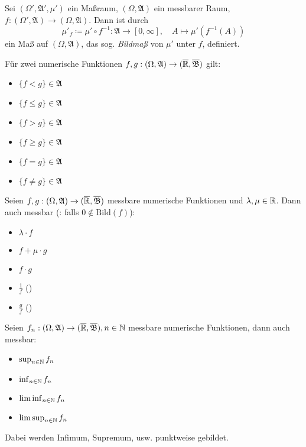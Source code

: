 \documentclass{cheat-sheet}
\newcommand{\Alg}{\mathfrak{A}} %
\newcommand{\ER}{\overline\R} %
\newcommand{\Bor}{\mathfrak{B}} %
\begin{document}
\begin{defn}
  Sei $(\Omega', \Alg', \mu')$ ein Maßraum, $(\Omega, \Alg)$ ein messbarer Raum, $f : (\Omega', \Alg) \to (\Omega, \Alg)$. Dann ist durch
  \[ \mu'_f \coloneqq \mu' \circ f^{-1} : \Alg \to [0, \infty], \quad A \mapsto \mu'(f^{-1}(A)) \]
  ein Maß auf $(\Omega, \Alg)$, das sog. \emph{Bildmaß} von $\mu'$ unter $f$, definiert.
\end{defn}

\begin{satz}
  Für zwei numerische Funktionen $f, g : (\Omega, \Alg) \to (\ER, \overline{\Bor})$ gilt:
  \begin{multicols}{3}
    \begin{itemize}
      \item $\{ f < g \} \in \Alg$
      \item $\{ f \leq g \} \in \Alg$
      \item $\{ f > g \} \in \Alg$
      \item $\{ f \geq g \} \in \Alg$
      \item $\{ f = g \} \in \Alg$
      \item $\{ f \not= g \} \in \Alg$
    \end{itemize}
  \end{multicols}
\end{satz}

\begin{satz}
  Seien $f, g : (\Omega, \Alg) \to (\ER, \overline{\Bor})$ messbare numerische Funktionen und $\lambda, \mu \in \mathbb{R}$. Dann auch messbar (\ddag: falls $0 \not\in \mathrm{Bild}(f)$):
  \begin{multicols}{5}
    \begin{itemize}
      \item $\lambda \cdot f$
      \item $f + \mu \cdot g$
      \item $f \cdot g$
      \item $\tfrac{1}{f}$ (\ddag)
      \item $\tfrac{g}{f}$ (\ddag)
    \end{itemize}
  \end{multicols}
\end{satz}

\begin{satz}
  Seien $f_n : (\Omega, \Alg) \to (\ER, \overline{\Bor}), n \in \N$ messbare numerische Funktionen, dann auch messbar:
  \begin{multicols}{4}
    \begin{itemize}
      \item $\sup_{n \in \mathbb{N}} f_n$
      \item $\inf_{n \in \mathbb{N}} f_n$
      \item $\liminf_{n \in \mathbb{N}} f_n$
      \item $\limsup_{n \in \mathbb{N}} f_n$
    \end{itemize}
  \end{multicols}
  \vspace{4pt}
  Dabei werden Infimum, Supremum, usw. punktweise gebildet.
\end{satz}
\end{document}
